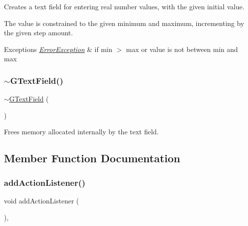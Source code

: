 Creates a text field for entering real number values, with the given initial value. 

The value is constrained to the given minimum and maximum, incrementing by the given step amount. 
\begin{DoxyExceptions}{Exceptions}
{\em \mbox{\hyperlink{classErrorException}{Error\+Exception}}} & if min $>$ max or value is not between min and max \\
\hline
\end{DoxyExceptions}
\mbox{\label{classGTextField_af35ec0a6daa2f8aa95d6b19e18fad662}} 
\subsubsection{\texorpdfstring{$\sim$\+G\+Text\+Field()}{~GTextField()}}
{\footnotesize\ttfamily $\sim$\mbox{\hyperlink{classGTextField}{G\+Text\+Field}} (\begin{DoxyParamCaption}{ }\end{DoxyParamCaption})\hspace{0.3cm}{\ttfamily [virtual]}}



Frees memory allocated internally by the text field. 



\subsection{Member Function Documentation}
\mbox{\label{classGInteractor_a02f20ea6edfa0671f31c4c648a253833}} 
\subsubsection{\texorpdfstring{add\+Action\+Listener()}{addActionListener()}}
{\footnotesize\ttfamily void add\+Action\+Listener (\begin{DoxyParamCaption}{ }\end{DoxyParamCaption})\hspace{0.3cm}{\ttfamily [virtual]}, {\ttfamily [inherited]}}



